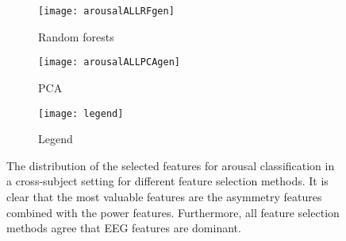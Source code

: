 \begin{figure}[!tbp]
  \begin{subfigure}[b]{0.3\textwidth}
    \texttt{[image: arousalALLRFgen]}
    \caption{Random forests}
  \end{subfigure}
  \hfill
  \begin{subfigure}[b]{0.3\textwidth}
    \texttt{[image: arousalALLPCAgen]}
    \caption{PCA}
  \end{subfigure}
  \hfill
  \begin{subfigure}[b]{0.3\textwidth}
    \texttt{[image: legend]}
    \caption{Legend\label{arousalpieslegendgen}}
  \end{subfigure}
  \caption{The distribution of the selected features for arousal classification in a cross-subject setting for different feature selection methods. It is clear that the most valuable features are the asymmetry features combined with the power features. Furthermore, all feature selection methods agree that EEG features are dominant.\label{arousalpiesgen}}
\end{figure}

\clearpage

